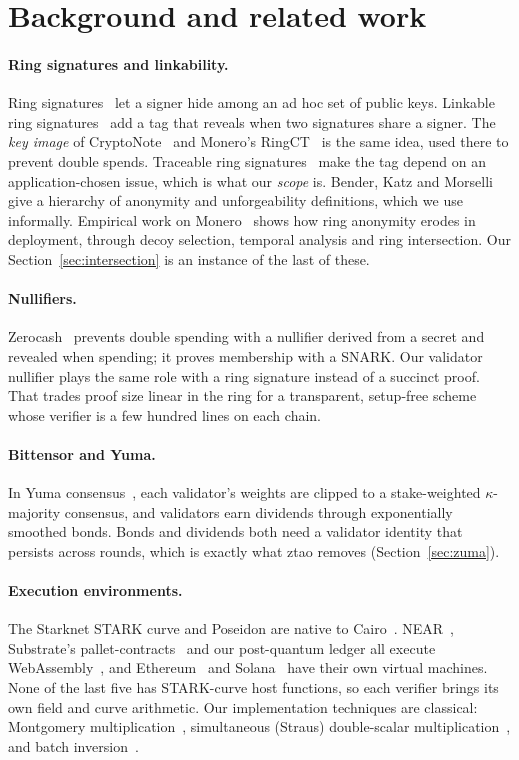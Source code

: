 \documentclass[11pt]{article}
\theoremstyle{remark}
\begin{document}
\section{Background and related work}\label{sec:related}

\paragraph{Ring signatures and linkability.} Ring signatures~\cite{rst01} let a signer hide among an ad hoc set of public keys. Linkable ring signatures~\cite{lww04} add a tag that reveals when two signatures share a signer. The \emph{key image} of CryptoNote~\cite{cryptonote} and Monero's RingCT~\cite{ringct} is the same idea, used there to prevent double spends. Traceable ring signatures~\cite{fs07} make the tag depend on an application-chosen issue, which is what our \emph{scope} is. Bender, Katz and Morselli~\cite{bkm06} give a hierarchy of anonymity and unforgeability definitions, which we use informally. Empirical work on Monero~\cite{kumar17,moser18} shows how ring anonymity erodes in deployment, through decoy selection, temporal analysis and ring intersection. Our Section~\ref{sec:intersection} is an instance of the last of these.

\paragraph{Nullifiers.} Zerocash~\cite{zerocash} prevents double spending with a nullifier derived from a secret and revealed when spending; it proves membership with a SNARK. Our validator nullifier plays the same role with a ring signature instead of a succinct proof. That trades proof size linear in the ring for a transparent, setup-free scheme whose verifier is a few hundred lines on each chain.

\paragraph{Bittensor and Yuma.} In Yuma consensus~\cite{yumadocs}, each validator's weights are clipped to a stake-weighted $\kappa$-majority consensus, and validators earn dividends through exponentially smoothed bonds. Bonds and dividends both need a validator identity that persists across rounds, which is exactly what ztao removes (Section~\ref{sec:zuma}).

\paragraph{Execution environments.} The Starknet STARK curve and Poseidon are native to Cairo~\cite{cairo,stark}. NEAR~\cite{nightshade}, Substrate's pallet-contracts~\cite{polkadot,ink} and our post-quantum ledger all execute WebAssembly~\cite{wasm}, and Ethereum~\cite{yellowpaper} and Solana~\cite{solana} have their own virtual machines. None of the last five has STARK-curve host functions, so each verifier brings its own field and curve arithmetic. Our implementation techniques are classical: Montgomery multiplication~\cite{montgomery85}, simultaneous (Straus) double-scalar multiplication~\cite{straus64}, and batch inversion~\cite{montgomery87}.
\end{document}
